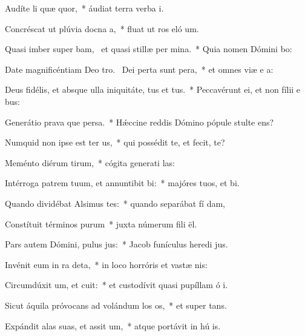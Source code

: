 \item Audíte li quæ quor,~* áudiat terra verba  i.
\item Concréscat ut plúvia docna a,~* fluat ut ros eló um.
\item Quasi imber super bam,~\pscross{} et quasi stillæ per mina.~* Quia nomen Dómini bo:
\item Date magnificéntiam Deo tro.~\pscross{} Dei perta sunt pera,~* et omnes viæ e a:
\item Deus fidélis, et absque ulla iniquitáte, tus et tus.~* Peccavérunt ei, et non fílii e  bus:
\item Generátio prava que persa.~* Hǽccine reddis Dómino pópule stulte  ens?
\item Numquid non ipse est ter us,~* qui possédit te, et fecit,   te?
\item Meménto diérum tirum,~* cógita generati las:
\item Intérroga patrem tuum, et annuntibit bi:~* majóres tuos, et  bi.
\item Quando dividébat Alsimus tes:~* quando separábat fí dam,
\item Constítuit términos purum~* juxta númerum fili ël.
\item Pars autem Dómini, pulus jus:~* Jacob funículus heredi jus.
\item Invénit eum in ra deta,~* in loco horróris et vastæ nis:
\item Circumdúxit um, et cuit:~* et custodívit quasi pupíllam ó i.
\item Sicut áquila próvocans ad volándum los os,~* et super  tans.
\item Expándit alas suas, et assit um,~* atque portávit in hú is.
